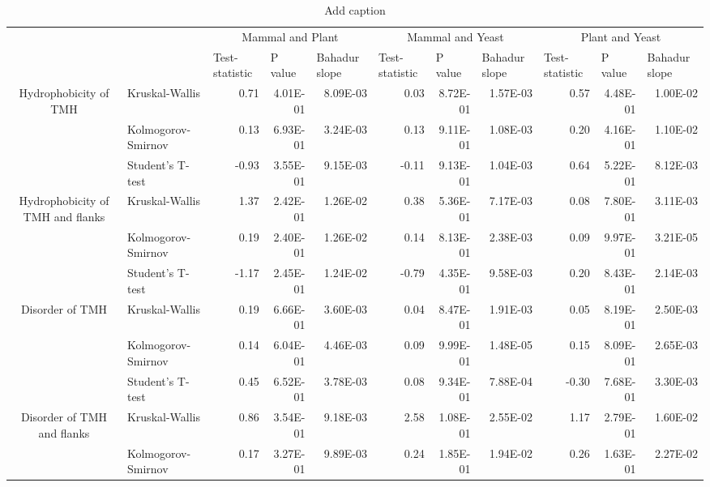 \begin{table}[htbp]
  \centering
  \caption{Add caption}
    \begin{tabular}{clrrrrrrrrr}
          &       & \multicolumn{3}{c}{Mammal and Plant} & \multicolumn{3}{c}{Mammal and Yeast} & \multicolumn{3}{c}{Plant and Yeast} \\
          &       & \multicolumn{1}{l}{ Test-statistic} & \multicolumn{1}{l}{ P value} & \multicolumn{1}{l}{ Bahadur slope} & \multicolumn{1}{l}{ Test-statistic} & \multicolumn{1}{l}{ P value} & \multicolumn{1}{l}{ Bahadur slope} & \multicolumn{1}{l}{ Test-statistic} & \multicolumn{1}{l}{ P value} & \multicolumn{1}{l}{ Bahadur slope} \\
    \multirow{3}[0]{*}{Hydrophobicity of TMH } &  Kruskal-Wallis & 0.71  & 4.01E-01 & 8.09E-03 & 0.03  & 8.72E-01 & 1.57E-03 & 0.57  & 4.48E-01 & 1.00E-02 \\
          &  Kolmogorov-Smirnov & 0.13  & 6.93E-01 & 3.24E-03 & 0.13  & 9.11E-01 & 1.08E-03 & 0.20  & 4.16E-01 & 1.10E-02 \\
          &  Student's T-test & -0.93 & 3.55E-01 & 9.15E-03 & -0.11 & 9.13E-01 & 1.04E-03 & 0.64  & 5.22E-01 & 8.12E-03 \\
    \multirow{3}[0]{*}{Hydrophobicity of TMH and flanks } &  Kruskal-Wallis & 1.37  & 2.42E-01 & 1.26E-02 & 0.38  & 5.36E-01 & 7.17E-03 & 0.08  & 7.80E-01 & 3.11E-03 \\
          &  Kolmogorov-Smirnov & 0.19  & 2.40E-01 & 1.26E-02 & 0.14  & 8.13E-01 & 2.38E-03 & 0.09  & 9.97E-01 & 3.21E-05 \\
          &  Student's T-test & -1.17 & 2.45E-01 & 1.24E-02 & -0.79 & 4.35E-01 & 9.58E-03 & 0.20  & 8.43E-01 & 2.14E-03 \\
    \multirow{3}[0]{*}{Disorder of TMH } &  Kruskal-Wallis & 0.19  & 6.66E-01 & 3.60E-03 & 0.04  & 8.47E-01 & 1.91E-03 & 0.05  & 8.19E-01 & 2.50E-03 \\
          &  Kolmogorov-Smirnov & 0.14  & 6.04E-01 & 4.46E-03 & 0.09  & 9.99E-01 & 1.48E-05 & 0.15  & 8.09E-01 & 2.65E-03 \\
          &  Student's T-test & 0.45  & 6.52E-01 & 3.78E-03 & 0.08  & 9.34E-01 & 7.88E-04 & -0.30 & 7.68E-01 & 3.30E-03 \\
    \multirow{3}[0]{*}{Disorder of TMH and flanks } &  Kruskal-Wallis & 0.86  & 3.54E-01 & 9.18E-03 & 2.58  & 1.08E-01 & 2.55E-02 & 1.17  & 2.79E-01 & 1.60E-02 \\
          &  Kolmogorov-Smirnov & 0.17  & 3.27E-01 & 9.89E-03 & 0.24  & 1.85E-01 & 1.94E-02 & 0.26  & 1.63E-01 & 2.27E-02 \\

\end{tabular}
\end{table}
